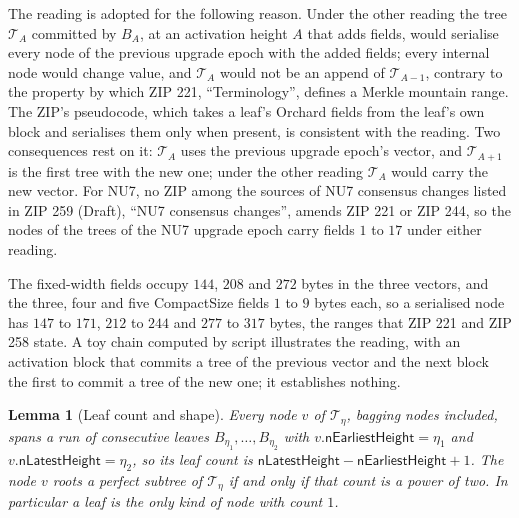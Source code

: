 \documentclass[11pt,a4paper]{article}
\newtheorem{lemma}[theorem]{Lemma}
\theoremstyle{definition}
\begin{document}
The reading is adopted for the following reason. Under the other reading the
tree $\mathcal{T}_A$ committed by $B_A$, at an activation height $A$ that adds
fields, would serialise every node of the previous upgrade epoch with the
added fields; every internal node would change value, and $\mathcal{T}_A$
would not be an append of $\mathcal{T}_{A-1}$, contrary to the property by
which ZIP 221, ``Terminology'', defines a Merkle mountain range. The ZIP's
pseudocode, which takes a leaf's Orchard fields from the leaf's own block and
serialises them only when present, is consistent with the reading. Two
consequences rest on it: $\mathcal{T}_A$ uses the previous upgrade epoch's
vector, and $\mathcal{T}_{A+1}$ is the first tree with the new one; under the
other reading $\mathcal{T}_A$ would carry the new vector. For NU7, no ZIP among
the sources of NU7 consensus changes listed in ZIP 259 (Draft), ``NU7 consensus
changes'', amends ZIP 221 or ZIP 244, so the nodes of the trees of the NU7
upgrade epoch carry fields $1$ to $17$ under either reading.

The fixed-width fields occupy $144$, $208$ and $272$ bytes in the three
vectors, and the three, four and five CompactSize fields $1$ to $9$ bytes
each, so a serialised node has $147$ to $171$, $212$ to $244$ and $277$ to
$317$ bytes, the ranges that ZIP 221 and ZIP 258 state. A toy chain computed
by script illustrates the reading, with an
activation block that commits a tree of the previous vector and the next
block the first to commit a tree of the new one; it establishes nothing.

\begin{lemma}[Leaf count and shape]\label{lem:leaf-count}
Every node $v$ of $\mathcal{T}_\eta$, bagging nodes included, spans a run of
consecutive leaves $B_{\eta_1}, \dots, B_{\eta_2}$ with
$v.\mathsf{nEarliestHeight} = \eta_1$ and
$v.\mathsf{nLatestHeight} = \eta_2$, so its leaf count is
$\mathsf{nLatestHeight} - \mathsf{nEarliestHeight} + 1$. The node $v$ roots
a perfect subtree of $\mathcal{T}_\eta$ if and only if that count is a power
of two. In particular a leaf is the only kind of node with count $1$.
\end{lemma}
\end{document}
